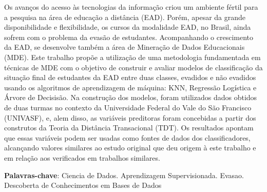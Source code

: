\setlength{\absparsep}{18pt} %
\begin{resumo}

  Os avanços do acesso às tecnologias da informação criou um ambiente fértil
  para a pesquisa na área de educação a distância (EAD). Porém, apesar da grande
  disponibilidade e flexibilidade, os cursos da modalidade EAD, no Brasil, ainda
  sofrem com o problema da evasão de estudantes. Acompanhando o crescimento da
  EAD, se desenvolve também a área de Mineração de Dados Educacionais (MDE).
  Este trabalho propõe a utilização de uma metodologia fundamentada em técnicas
  de MDE com o objetivo de construir e avaliar modelos de classificação da
  situação final de estudantes da EAD entre duas classes, evadidos e não
  evadidos usando os algoritmos de aprendizagem de máquina: KNN, Regressão
  Logística e Árvore de Decisisão. Na construção dos modelos, foram utilizados
  dados obtidos de duas turmas no contexto da Universidade Federal do Vale do
  São Francisco (UNIVASF), e, alem disso, as variáveis preditoras foram
  concebidas a partir dos construtos da Teoria da Distância Transacional (TDT).
  Os resultados apontam que essas variáveis podem ser usadas como fontes de
  dados dos classificadores, alcançando valores similares ao estudo original que
  deu origem à este trabalho e em relação aos verificados em trabalhos
  similares.

  \textbf{Palavras-chave}: Ciencia de Dados. Aprendizagem Supervisionada. Evasao. Descoberta de Conhecimentos em Bases de Dados

\end{resumo}
\newpage


